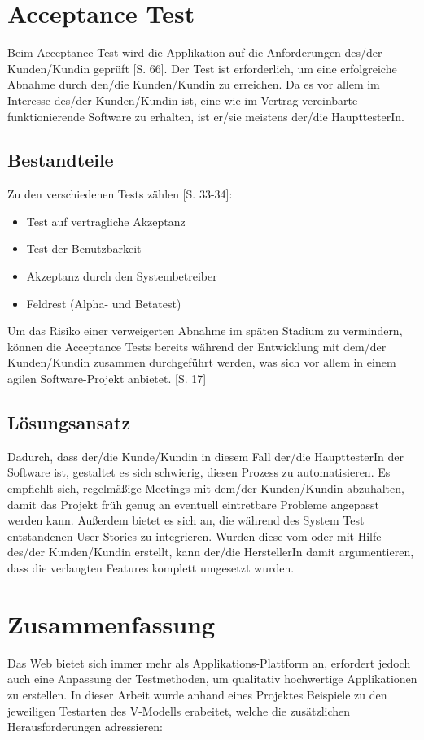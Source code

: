 \documentclass[a4paper,bibtotoc,oneside]{scrbook}
\begin{document}
\chapter{Acceptance Test}
Beim Acceptance Test wird die Applikation auf die Anforderungen des/der Kunden/Kundin geprüft \cite{test_large_systems}[S. 66]. Der Test ist erforderlich, um eine erfolgreiche Abnahme durch den/die Kunden/Kundin zu erreichen. Da es vor allem im Interesse des/der Kunden/Kundin ist, eine wie im Vertrag vereinbarte funktionierende Software zu erhalten, ist er/sie meistens der/die HaupttesterIn.

\section{Bestandteile}
Zu den verschiedenen Tests zählen \cite{betrieb}[S. 33-34]:

\begin{itemize}
   \item \glqq Test auf vertragliche Akzeptanz\grqq
   \item \glqq Test der Benutzbarkeit\grqq
   \item \glqq Akzeptanz durch den Systembetreiber\grqq
   \item \glqq Feldrest (Alpha- und Betatest)\grqq
 \end{itemize} 

Um das Risiko einer verweigerten Abnahme im späten Stadium zu vermindern, können die Acceptance Tests bereits während der Entwicklung mit dem/der Kunden/Kundin zusammen durchgeführt werden, was sich vor allem in einem agilen Software-Projekt anbietet. \cite{eval_regression}[S. 17]

\section{Lösungsansatz}
Dadurch, dass der/die Kunde/Kundin in diesem Fall der/die HaupttesterIn der Software ist, gestaltet es sich schwierig, diesen Prozess zu automatisieren. Es empfiehlt sich, regelmäßige Meetings mit dem/der Kunden/Kundin abzuhalten, damit das Projekt früh genug an eventuell eintretbare Probleme angepasst werden kann. Außerdem bietet es sich an, die während des System Test entstandenen User-Stories zu integrieren. Wurden diese vom oder mit Hilfe des/der Kunden/Kundin erstellt, kann der/die HerstellerIn damit argumentieren, dass die verlangten Features komplett umgesetzt wurden.


\chapter{Zusammenfassung}
Das Web bietet sich immer mehr als Applikations-Plattform an, erfordert jedoch auch eine Anpassung der Testmethoden, um qualitativ hochwertige Applikationen zu erstellen. In dieser Arbeit wurde anhand eines Projektes Beispiele zu den jeweiligen Testarten des V-Modells erabeitet, welche die zusätzlichen Herausforderungen adressieren:
\end{document}

